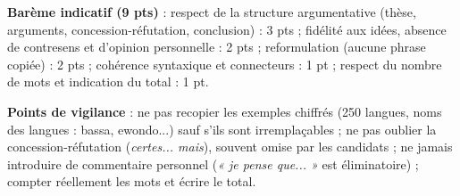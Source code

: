 \documentclass[11pt]{article}
\begin{document}
\begin{corrige}
\textbf{Barème indicatif (9 pts)} : respect de la structure argumentative (thèse, arguments, concession-réfutation, conclusion) : 3 pts ; fidélité aux idées, absence de contresens et d'opinion personnelle : 2 pts ; reformulation (aucune phrase copiée) : 2 pts ; cohérence syntaxique et connecteurs : 1 pt ; respect du nombre de mots et indication du total : 1 pt.

\textbf{Points de vigilance} : ne pas recopier les exemples chiffrés (250 langues, noms des langues : bassa, ewondo...) sauf s'ils sont irremplaçables ; ne pas oublier la concession-réfutation (\emph{certes... mais}), souvent omise par les candidats ; ne jamais introduire de commentaire personnel (\emph{« je pense que... »} est éliminatoire) ; compter réellement les mots et écrire le total.
\end{corrige}
\end{document}
